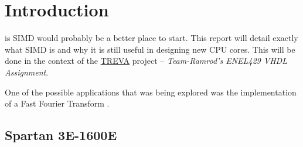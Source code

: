 \section{Introduction}

 is SIMD would probably be a better place to start.  This
report will detail exactly what SIMD is and why it is still useful in designing
new CPU cores.  This will be done in the context of the
\href{https://github.com/team-ramrod/treva}{TREVA} project --
\emph{Team-Ramrod's ENEL429 VHDL Assignment}.

One of the possible applications that was being explored was the implementation
of a Fast Fourier Transform \cite{Jamieson198648}.


\subsection{Spartan 3E-1600E}

